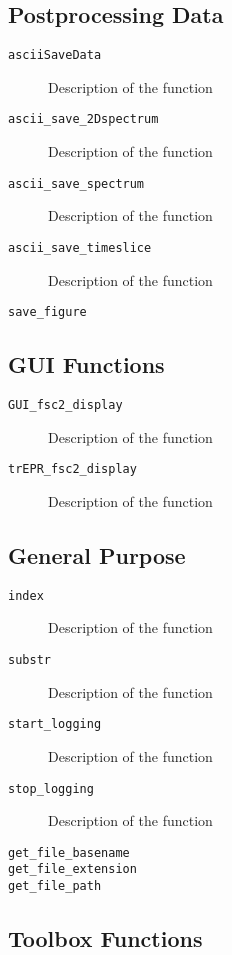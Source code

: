 \documentclass[a4paper]{refrep}
\begin{document}
\subsection{Postprocessing Data}

\begin{description}
  \item[\texttt{asciiSaveData}] Description of the function
  \item[\texttt{ascii\_save\_2Dspectrum}] Description of the function
  \item[\texttt{ascii\_save\_spectrum}] Description of the function
  \item[\texttt{ascii\_save\_timeslice}] Description of the function
  \item[\texttt{save\_figure}]
\end{description}


\subsection{GUI Functions}

\begin{description}
  \item[\texttt{GUI\_fsc2\_display}] Description of the function
  \item[\texttt{trEPR\_fsc2\_display}] Description of the function
\end{description}


\subsection{General Purpose}

\begin{description}
  \item[\texttt{index}] Description of the function
  \item[\texttt{substr}] Description of the function
  \item[\texttt{start\_logging}] Description of the function
  \item[\texttt{stop\_logging}] Description of the function
  \item[\texttt{get\_file\_basename}]
  \item[\texttt{get\_file\_extension}]
  \item[\texttt{get\_file\_path}]
\end{description}


\subsection{Toolbox Functions}
\end{document}
